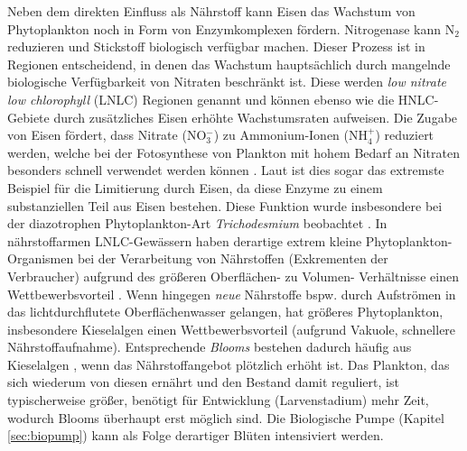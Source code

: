 \documentclass[12pt,a4paper,onecolumn]{scrartcl}
\begin{document}
Neben dem direkten Einfluss als Nährstoff kann Eisen das Wachstum von Phytoplankton noch in Form von Enzymkomplexen fördern. Nitrogenase kann N$_2$ reduzieren und Stickstoff biologisch verfügbar machen. Dieser Prozess ist in Regionen entscheidend, in denen das Wachstum hauptsächlich durch mangelnde biologische Verfügbarkeit von Nitraten beschränkt ist. Diese werden \textit{low nitrate low chlorophyll} (LNLC) Regionen genannt und können ebenso wie die HNLC-Gebiete durch zusätzliches Eisen erhöhte Wachstumsraten aufweisen.  Die Zugabe von Eisen fördert, dass Nitrate (NO$_3^-$) zu Ammonium-Ionen (NH$_4^+$) reduziert werden, welche bei der Fotosynthese von Plankton mit hohem Bedarf an Nitraten besonders schnell verwendet werden können \citep{Emerson.2009}. Laut \citet{Emerson.2009} ist dies sogar das extremste Beispiel für die Limitierung durch Eisen, da diese Enzyme zu einem substanziellen Teil aus Eisen bestehen. Diese Funktion wurde insbesondere bei der diazotrophen Phytoplankton-Art \textit{Trichodesmium} beobachtet \citep{Falkowski.1998}.  In nährstoffarmen LNLC-Gewässern haben derartige extrem kleine Phytoplankton-Organismen bei der Verarbeitung von Nährstoffen (Exkrementen der Verbraucher) aufgrund des größeren Oberflächen- zu Volumen- Verhältnisse einen Wettbewerbsvorteil \citep{Falkowski.1998}. Wenn hingegen \textit{neue} Nährstoffe bspw. durch Aufströmen in das lichtdurchflutete Oberflächenwasser gelangen, hat größeres Phytoplankton, insbesondere Kieselalgen einen Wettbewerbsvorteil (aufgrund Vakuole, schnellere Nährstoffaufnahme). Entsprechende \textit{Blooms} bestehen dadurch häufig aus Kieselalgen \citep{Boyd.2007}, wenn das Nährstoffangebot plötzlich erhöht ist. Das Plankton, das sich wiederum von diesen ernährt und den Bestand damit reguliert, ist typischerweise größer, benötigt für Entwicklung (Larvenstadium) mehr Zeit, wodurch Blooms überhaupt erst möglich sind. Die Biologische Pumpe (Kapitel \ref{sec:biopump}) kann als Folge derartiger Blüten intensiviert werden. \\
\end{document}

